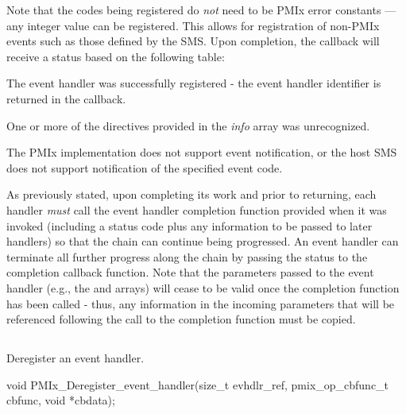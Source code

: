 Note that the codes being registered do \textit{not} need to be \ac{PMIx} error constants --- any integer value can be registered. This allows for registration of non-PMIx events such as those defined by the \ac{SMS}. Upon completion, the callback will receive a status based on the following table:

\begin{constantdesc}
\item {} The event handler was successfully registered - the event handler identifier is returned in the callback.
\item {} One or more of the directives provided in the \textit{info} array was unrecognized.
\item {} The \ac{PMIx} implementation does not support event notification, or the host \ac{SMS} does not support notification of the specified event code.
\end{constantdesc}


\adviceuserstart
As previously stated, upon completing its work and prior to returning, each handler \textit{must} call the event handler completion function provided when it was invoked (including a status code plus any information to be passed to later handlers) so that the chain can continue being progressed. An event handler can terminate all further progress along the chain by passing the  status to the completion callback function. Note that the parameters passed to the event handler (e.g., the  and  arrays) will cease to be valid once the completion function has been called - thus, any information in the incoming parameters that will be referenced following the call to the completion function must be copied.
\adviceuserend

\subsection{}

\summary

Deregister an event handler.

\format

\cspecificstart
\begin{codepar}
void
PMIx_Deregister_event_handler(size_t evhdlr_ref,
                              pmix_op_cbfunc_t cbfunc,
                              void *cbdata);
\end{codepar}
\cspecificend

